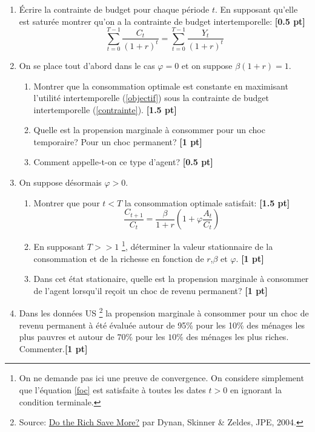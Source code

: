 \documentclass[a4paper,12pt]{article}
\begin{document}
\begin{enumerate}
    \item Écrire la contrainte de budget pour chaque période $t$. En supposant qu'elle est saturée montrer qu'on a la contrainte de budget intertemporelle: \hfill\textbf{[0.5 pt]} 
    \begin{equation}
    \sum_{t=0}^{T-1} \frac{C_t}{(1+r)^t} = \sum_{t=0}^{T-1} \frac{Y_t}{(1+r)^t} \label{contrainte}
    \end{equation}
    \item  On se place tout d'abord dans le cas $\varphi=0$ et on suppose $\beta (1+r)=1$.
        \begin{enumerate}
            \item Montrer que la consommation optimale est constante en maximisant l'utilité intertemporelle (\ref{objectif}) sous la contrainte de budget intertemporelle (\ref{contrainte}). \hfill \textbf{[1.5 pt]}  
            \item Quelle est la propension marginale à consommer pour un choc temporaire? Pour un choc permanent? \hfill \textbf{[1 pt]}  
            \item Comment appelle-t-on ce type d'agent? \hfill \textbf{[0.5 pt]}
        \end{enumerate} 
    
    \item On suppose désormais  $\varphi>0$.
            \begin{enumerate}
                \item Montrer que pour $t<T$ la consommation optimale satisfait: \hfill\textbf{[1.5 pt]}
                    \begin{equation}
                    \frac{C_{t+1}}{C_t} = \frac{\beta}{1+r} \left(1 + \varphi \frac{A_t}{C_t} \right)
                    \label{foc}
                    \end{equation}
                \item En supposant $T>>1$ \footnote{On ne demande pas ici une preuve de convergence. 
                On considere simplement que l'équation \ref{foc} est satisfaite à toutes les dates $t>0$ en ignorant la condition terminale.}, déterminer la valeur stationnaire de la consommation et de la richesse en fonction de $r$,$\beta$ et $\varphi$. \hfill\textbf{[1 pt]}
                \item Dans cet état stationaire, quelle est la propension marginale à consommer de l'agent lorsqu'il reçoit un choc de revenu permanent? \hfill\textbf{[1 pt]}
            \end{enumerate} 

    \item Dans les données US 
    \footnote{Source: \underline{Do the Rich Save More?} par Dynan, Skinner \& Zeldes, JPE, 2004. } 
    la propension marginale à consommer pour un choc de revenu permanent à été évaluée autour de 95\% pour les 10\% des ménages les plus pauvres et autour de $70\%$ pour les $10\%$ des ménages les plus riches. \\
    Commenter.\hfill\textbf{[1 pt]}
    \end{enumerate}
\end{document}
